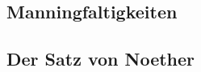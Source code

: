 \subsection{Manningfaltigkeiten
\label{buch:subsection:mannigfaltigkeit}}

\subsection{Der Satz von Noether
\label{buch:subsection:noether}}







